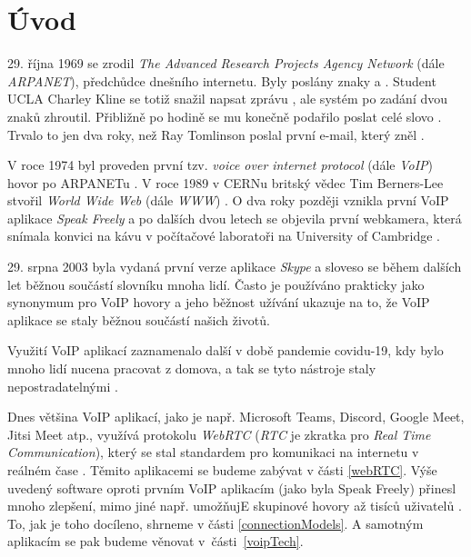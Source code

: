 \section{Úvod}

29. října 1969 se zrodil \textit{The Advanced Research Projects Agency Network}
(dále \textit{ARPANET}), předchůdce dnešního internetu. Byly poslány znaky
 a . Student UCLA Charley Kline se totiž snažil napsat zprávu
, ale systém po zadání dvou znaků zhroutil. Přibližně po hodině se mu
konečně podařilo poslat celé slovo
\parencite{PBS-SimpleHelloFirstMessageOverARPANET}. Trvalo to jen dva roky, než Ray
Tomlinson poslal první e-mail, který zněl 
\parencite{YahooFinance-SimpleHelloFirstMessageOverARPANET}.

V roce 1974 byl proveden první tzv. \textit{voice over internet protocol} (dále
\textit{VoIP}) hovor po ARPANETu
\parencite{DigiFone-WhatYouMightNotKnowAboutTheHistoryOfVoIP}. V roce 1989 v CERNu
britský vědec Tim Berners-Lee stvořil \textit{World Wide Web} (dále
\textit{WWW}) \parencite{CERN-TheBirthOfTheWeb}. O dva roky později vznikla první
VoIP aplikace \textit{Speak Freely}
\parencite{DigiFone-WhatYouMightNotKnowAboutTheHistoryOfVoIP} a po dalších dvou
letech se objevila první webkamera, která snímala konvici na kávu v počítačové
laboratoři na University of Cambridge \parencite{BBC-FirstWebcamMadeCoffeePotFamous}.

29. srpna 2003 byla vydaná první verze aplikace \textit{Skype}
\parencite{ArsTechnica-TheStrangeStoryOfSkype} a sloveso  se během
dalších let běžnou součástí slovníku mnoha lidí. Často je používáno prakticky
jako synonymum pro VoIP hovory a jeho běžnost užívání ukazuje na to, že VoIP
aplikace se staly běžnou součástí našich životů.

Využití VoIP aplikací zaznamenalo další  v době pandemie covidu-19, kdy
bylo mnoho lidí nucena pracovat z domova, a tak se tyto nástroje staly
nepostradatelnými \parencite{OnSIP-VoIPStatsTrendsCovidImpact}.

Dnes většina VoIP aplikací, jako je např. Microsoft Teams, Discord, Google Meet,
Jitsi Meet atp., využívá protokolu \textit{WebRTC} (\textit{RTC} je zkratka pro
\textit{Real Time Communication}), který se stal standardem pro komunikaci na
internetu v reálném čase \parencite{LevelUp-WhatPowerMeetAndTeams,
    Discord-HowDoesItHandleMillionsOfUsers, Jitsi-Projects, WebRTCORG-Homepage}.
Těmito aplikacemi se budeme zabývat v části \ref{webRTC}. Výše uvedený software
oproti prvním VoIP aplikacím (jako byla Speak Freely) přinesl mnoho zlepšení,
mimo jiné např. umožňujE skupinové hovory až tisíců uživatelů
\parencite{MicrosoftLearn-MSTeamsLimitsAndSpecs}. To, jak je toho docíleno, shrneme v
části \ref{connectionModels}. A samotným aplikacím se pak budeme věnovat
v~části~\ref{voipTech}.

